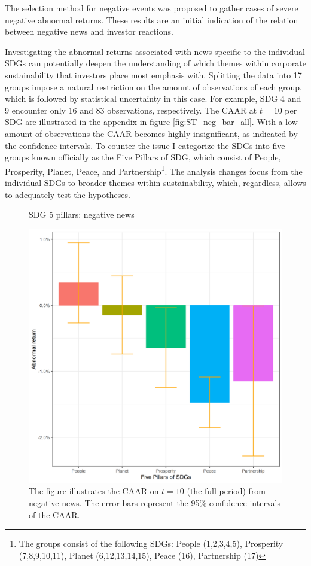 The selection method for negative events was proposed to gather cases of severe negative abnormal returns. These results are an initial indication of the relation between negative news and investor reactions. 

Investigating the abnormal returns associated with news specific to the individual SDGs can potentially deepen the understanding of which themes within corporate sustainability that investors place most emphasis with. Splitting the data into 17 groups impose a natural restriction on the amount of observations of each group, which is followed by statistical uncertainty in this case. For example, SDG 4 and 9 encounter only 16 and 83 observations, respectively. The CAAR at $t=10$ per SDG are illustrated in the appendix in figure \ref{fig:ST_neg_bar_all}. With a low amount of observations the CAAR becomes highly insignificant, as indicated by the confidence intervals. To counter the issue I categorize the SDGs into five groups known officially as the Five Pillars of SDG, which consist of People, Prosperity, Planet, Peace, and Partnership\footnote{The groups consist of the following SDGs: People (1,2,3,4,5), Prosperity (7,8,9,10,11), Planet (6,12,13,14,15), Peace (16), Partnership (17)}. The analysis changes focus from the individual SDGs to broader themes within sustainability, which, regardless, allows to adequately test the hypotheses.

\begin{figure} [H]
    \centering
    \caption{SDG 5 pillars: negative news}
    \includegraphics[scale=0.6]{Projekt/1.Figures analysis/ST_negative_sdg_bar_groups_0.png}
    \caption*{\footnotesize The figure illustrates the CAAR on $t = 10$ (the full period) from negative news. The error bars represent the 95\% confidence intervals of the CAAR.}
    \label{fig:ST_neg_bar}
\end{figure}


